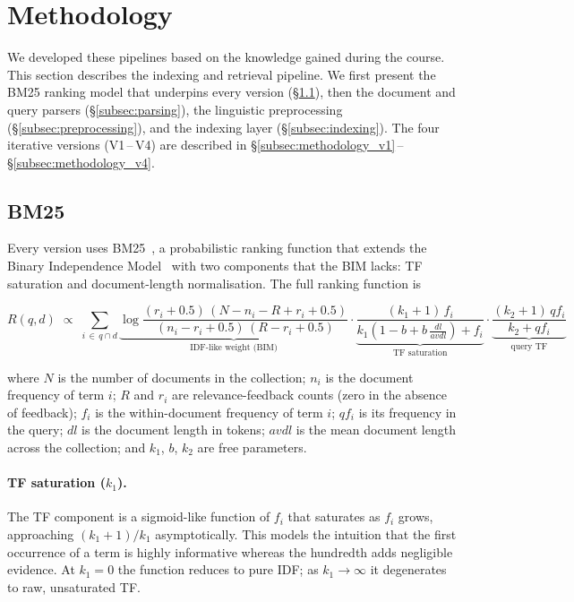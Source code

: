 \section{Methodology}
\label{sec:methodology}
We developed these pipelines based on the knowledge gained during the course.
This section describes the indexing and retrieval pipeline.  We first
present the BM25 ranking model that underpins every version
(\S\ref{sec:bm25}), then the document and query parsers
(\S\ref{subsec:parsing}), the linguistic preprocessing
(\S\ref{subsec:preprocessing}), and the indexing layer
(\S\ref{subsec:indexing}).  The four iterative versions
(V1\,–\,V4) are described in \S\ref{subsec:methodology_v1}\,–\,\S\ref{subsec:methodology_v4}.


\subsection{BM25}
\label{sec:bm25}

Every version uses BM25~\citep{Harman1994,RobertsonEtAl1994}, a
probabilistic ranking function that extends the Binary Independence
Model~\citep{RobertsonSparckJones1976} with two components that the BIM
lacks: \ac{TF} saturation and document-length normalisation.  The full
ranking function is

\begin{equation}
R(q,d) \;\propto\;
  \sum_{i \,\in\, q \cap d}
  \underbrace{
    \log\frac{(r_i+0.5)\,(N-n_i-R+r_i+0.5)}
             {(n_i-r_i+0.5)\,(R-r_i+0.5)}
  }_{\text{IDF-like weight (BIM)}}
  \cdot
  \underbrace{
    \frac{(k_1+1)\,f_i}
         {k_1\!\left(1-b+b\,\tfrac{dl}{avdl}\right)+f_i}
  }_{\text{TF saturation}}
  \cdot
  \underbrace{
    \frac{(k_2+1)\,qf_i}{k_2+qf_i}
  }_{\text{query TF}}
\label{eq:bm25}
\end{equation}

\noindent
where $N$ is the number of documents in the collection; $n_i$ is the
document frequency of term $i$; $R$ and $r_i$ are relevance-feedback
counts (zero in the absence of feedback); $f_i$ is the within-document
frequency of term $i$; $qf_i$ is its frequency in the query; $dl$ is
the document length in tokens; $avdl$ is the mean document length
across the collection; and $k_1$, $b$, $k_2$ are free parameters.

\paragraph{TF saturation ($k_1$).}
The TF component is a sigmoid-like function of $f_i$ that saturates as
$f_i$ grows, approaching $(k_1+1)/k_1$ asymptotically.  This models
the intuition that the first occurrence of a term is highly
informative whereas the hundredth adds negligible evidence.  At
$k_1=0$ the function reduces to pure IDF; as $k_1\!\to\!\infty$ it
degenerates to raw, unsaturated TF.

